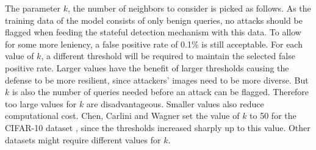 The parameter $k$, the number of neighbors to consider is picked as follows. As the training data of the model consists of only benign queries, no attacks should be flagged when feeding the stateful detection mechanism with this data. To allow for some more leniency, a false positive rate of 0.1\% is still acceptable. For each value of $k$, a different threshold will be required to maintain the selected false positive rate. Larger values have the benefit of larger thresholds causing the defense to be more resilient, since attackers' images need to be more diverse. But $k$ is also the number of queries needed before an attack can be flagged. Therefore too large values for $k$ are disadvantageous. Smaller values also reduce computational cost. Chen, Carlini and Wagner set the value of $k$ to 50 for the CIFAR-10  dataset \cite{cifar}, since the thresholds increased sharply up to this value. Other datasets might require different values for $k$.

